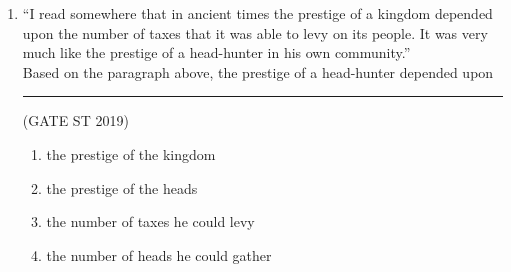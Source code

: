\documentclass[journal]{IEEEtran}
\begin{document}
\begin{enumerate}
\item ``I read somewhere that in ancient times the prestige of a kingdom depended upon the number of taxes that it was able to levy on its people. It was very much like the prestige of a head-hunter in his own community.''\\
Based on the paragraph above, the prestige of a head-hunter depended upon \rule{2cm}{0.1pt}\hfill(GATE ST 2019)
\begin{enumerate}
    \item the prestige of the kingdom  
    \item the prestige of the heads 
    \item the number of taxes he could levy 
    \item the number of heads he could gather 
\end{enumerate}
\end{enumerate}
\end{document}
